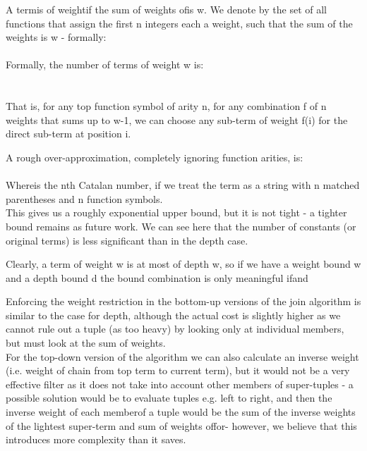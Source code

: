 A termis of weightif the sum of weights ofis w. 
We denote by  the set of all functions that assign the first n integers each a weight, such that the sum of the weights is w - formally:\\
\\
Formally, the number of terms of weight w is:\\
\\
\\
That is, for any top function symbol of arity n, for any combination f of n weights that sums up to w-1, we can choose any sub-term of weight f(i) for the direct sub-term at position i.

A rough over-approximation, completely ignoring function arities, is:\\
\\
Whereis the nth Catalan number, if we treat the term as a string with n matched parentheses and n function symbols.\\
This gives us a roughly exponential upper bound, but it is not tight - a tighter bound remains as future work.
We can see here that the number of constants (or original terms) is less significant than in the depth case.

Clearly, a term of weight w is at most of depth w, so if we have a weight bound w and a depth bound d 
the bound combination is only meaningful ifand

Enforcing the weight restriction in the bottom-up versions of the join algorithm is similar to the case for depth, 
although the actual cost is slightly higher as we cannot rule out a tuple (as too heavy) by looking only at individual members, but must look at the sum of weights.\\
For the top-down version of the algorithm we can also calculate an inverse weight (i.e. weight of chain from top term to current term), but it would not be a very effective filter as it does not take into account other members of super-tuples - a possible solution would be to evaluate tuples e.g. left to right, and then the inverse weight of each memberof a tuple would be the sum of the inverse weights of the lightest super-term and sum of weights offor- 
however, we believe that this introduces more complexity than it saves.

